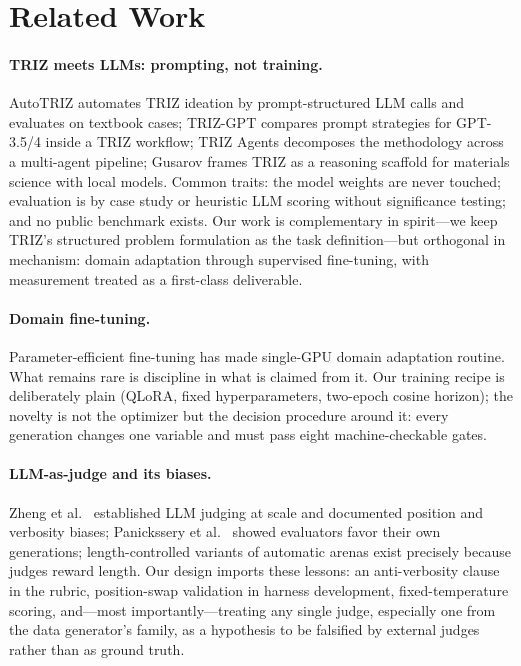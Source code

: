 \documentclass[11pt]{article}
\begin{document}
\section{Related Work}
\label{sec:related}

\paragraph{TRIZ meets LLMs: prompting, not training.}
AutoTRIZ \cite{autotriz} automates TRIZ ideation by prompt-structured
LLM calls and evaluates on textbook cases; TRIZ-GPT \cite{trizgpt}
compares prompt strategies for GPT-3.5/4 inside a TRIZ workflow;
TRIZ Agents \cite{trizagents} decomposes the methodology across a
multi-agent pipeline; Gusarov \cite{gusarov2026} frames TRIZ as a
reasoning scaffold for materials science with local models. Common
traits: the model weights are never touched; evaluation is by case
study or heuristic LLM scoring without significance testing; and no
public benchmark exists. Our work is complementary in spirit---we keep
TRIZ's structured problem formulation as the task definition---but
orthogonal in mechanism: domain adaptation through supervised
fine-tuning, with measurement treated as a first-class deliverable.

\paragraph{Domain fine-tuning.}
Parameter-efficient fine-tuning \cite{lora,qlora} has made single-GPU
domain adaptation routine. What remains rare is discipline in what is
claimed from it. Our training recipe is deliberately plain (QLoRA, fixed
hyperparameters, two-epoch cosine horizon); the novelty is not the
optimizer but the decision procedure around it: every generation changes
one variable and must pass eight machine-checkable gates.

\paragraph{LLM-as-judge and its biases.}
Zheng et al.\ \cite{mtbench} established LLM judging at scale and
documented position and verbosity biases; Panickssery et al.\
\cite{panickssery2024} showed evaluators favor their own generations;
length-controlled variants of automatic arenas \cite{alpacaeval} exist
precisely because judges reward length. Our design imports these
lessons: an anti-verbosity clause in the rubric, position-swap
validation in harness development, fixed-temperature scoring, and---most
importantly---treating any single judge, especially one from the data
generator's family, as a hypothesis to be falsified by external judges
rather than as ground truth.
\end{document}
